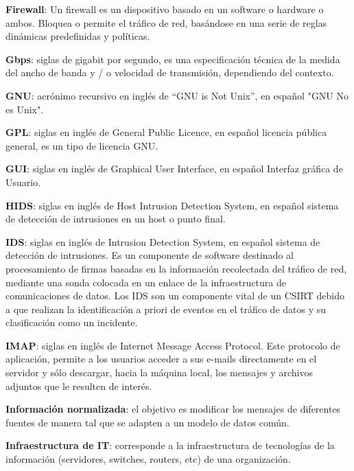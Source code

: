 \textbf{Firewall}: Un firewall es un dispositivo basado en un software o hardware o ambos. Bloquea o permite el tráfico de red, basándose en una serie de reglas dinámicas predefinidas y políticas. \par

\textbf{Gbps}: siglas de gigabit por segundo, es una especificación técnica de la medida del ancho de banda y / o velocidad de transmisión, dependiendo del contexto. \par

\textbf{GNU}: acrónimo recursivo en inglés de “GNU is Not Unix”, en español "GNU No es Unix". \par

\textbf{GPL}: siglas en inglés de General Public Licence, en español licencia pública general, es un tipo de licencia GNU. \par

\textbf{GUI}: siglas en inglés de Graphical User Interface, en español Interfaz gráfica de Usuario. \par

\textbf{HIDS}: siglas en inglés de Host Intrusion Detection System, en español sistema de detección de intrusiones en un host o punto final. \par

\textbf{IDS}: siglas en inglés de Intrusion Detection System, en español sistema de detección de intrusiones. Es un componente de software destinado al procesamiento de firmas basadas en la información recolectada del tráfico de red, mediante una sonda colocada en un enlace de la infraestructura de comunicaciones de datos. Los IDS son un componente vital de un CSIRT debido a que realizan la identificación a priori de eventos en el tráfico de datos y su clasificación como un incidente. \par

\textbf{IMAP}:  siglas en inglés de Internet Message Access Protocol. Este protocolo de aplicación, permite a los usuarios acceder a sus e-mails directamente en el servidor y sólo descargar, hacia la máquina local, los mensajes y archivos adjuntos que le resulten de interés. \par

\textbf{Información normalizada}: el objetivo es modificar los mensajes de diferentes fuentes de manera tal que se adapten a un modelo de datos común. \par

\textbf{Infraestructura de IT}: corresponde a la infraestructura de tecnologías de la información (servidores, switches, routers, etc) de una organización. \par

